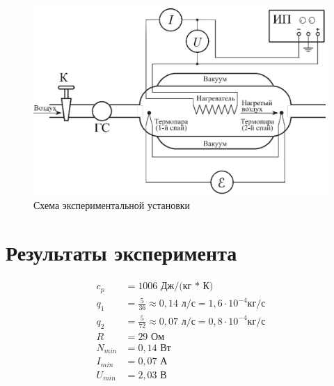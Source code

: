 \documentclass[a4paper, 12pt]{article}
\begin{document}
\begin{figure}[!ht]
    \begin{center}
        \includegraphics[scale=0.7]{foto3.png}
    \caption{Схема экспериментальной установки}
    \end{center}
\end{figure}

\section{Результаты эксперимента}
\begin{align}
c_{p} &= 1006  \text{ Дж/(кг * К)} \\
q_1   &= \frac{5}{36} \approx 0,14 \text{ л/с} = 1,6\cdot 10^{-4} \text{кг/с} \\
q_2   &= \frac{5}{72} \approx 0,07 \text{ л/с} = 0,8\cdot 10^{-4} \text{кг/с}\\
R   &= 29 \text{ Ом} \\
N_{min} &= 0,14 \text{ Вт}\\
I_{min} &= 0,07 \text{ А}\\
U_{min} &= 2,03 \text{ В} \\
\end{align}
\end{document}
